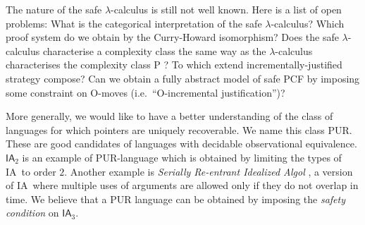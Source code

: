 \documentclass{llncs}
\newcommand\ialgol{\textsf{IA}}
\begin{document}
The nature of the safe $\lambda$-calculus is still not well
known. Here is a list of open problems: What is the categorical
interpretation of the safe $\lambda$-calculus? Which proof system do
we obtain by the Curry-Howard isomorphism? Does the safe
$\lambda$-calculus characterise a complexity class the same way as the
$\lambda$-calculus characterises the complexity class P
\cite{DBLP:conf/tlca/LeivantM93}?  To which extend
incrementally-justified strategy compose? Can we obtain a fully
abstract model of safe PCF by imposing some constraint on O-moves
(i.e.\ ``O-incremental justification'')?

More generally, we would like to have a better understanding of the
class of languages for which pointers are uniquely recoverable. We
name this class PUR. These are good candidates of languages with
decidable observational equivalence.  $\ialgol_2$ is an example of
PUR-language which is obtained by limiting the types of \ialgol\ to
order $2$. Another example is \emph{Serially Re-entrant Idealized
  Algol} \cite{abramsky:mchecking_ia}, a version of \ialgol\ where
multiple uses of arguments are allowed only if they do not overlap in
time.  We believe that a PUR language can be obtained by imposing the
\emph{safety condition} on $\ialgol_3$.

% 
% 
\end{document}
